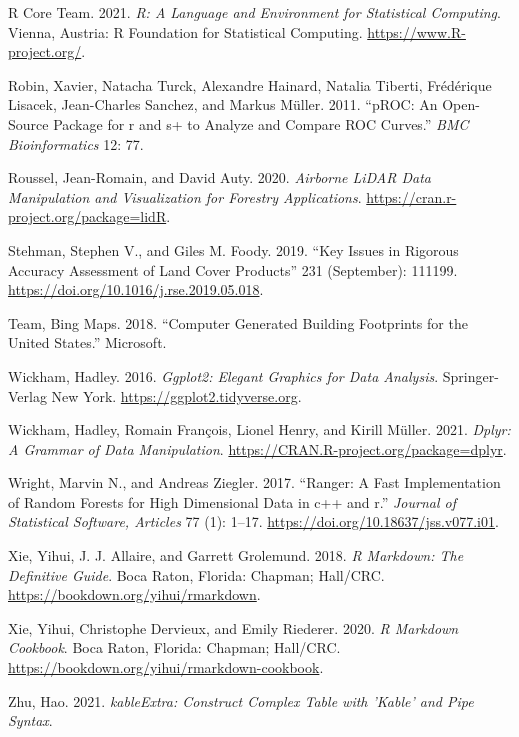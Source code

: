 \documentclass[]{elsarticle} %
\newlength{\cslhangindent}
\newenvironment{CSLReferences}[2] %
 {%
  \setlength{\parindent}{0pt}
  \ifodd #1 \everypar{\setlength{\hangindent}{\cslhangindent}}\ignorespaces\fi
  \ifnum #2 > 0
  \setlength{\parskip}{#2\baselineskip}
  \fi
 }%
 {}
\begin{document}
\begin{CSLReferences}{1}{0}
\leavevmode{}%
R Core Team. 2021. \emph{R: A Language and Environment for Statistical Computing}. Vienna, Austria: R Foundation for Statistical Computing. \url{https://www.R-project.org/}.

\leavevmode{}%
Robin, Xavier, Natacha Turck, Alexandre Hainard, Natalia Tiberti, Frédérique Lisacek, Jean-Charles Sanchez, and Markus Müller. 2011. {``pROC: An Open-Source Package for r and s+ to Analyze and Compare ROC Curves.''} \emph{BMC Bioinformatics} 12: 77.

\leavevmode{}%
Roussel, Jean-Romain, and David Auty. 2020. \emph{Airborne LiDAR Data Manipulation and Visualization for Forestry Applications}. \url{https://cran.r-project.org/package=lidR}.

\leavevmode{}%
Stehman, Stephen V., and Giles M. Foody. 2019. {``Key Issues in Rigorous Accuracy Assessment of Land Cover Products''} 231 (September): 111199. \url{https://doi.org/10.1016/j.rse.2019.05.018}.

\leavevmode{}%
Team, Bing Maps. 2018. {``{Computer Generated Building Footprints for the United States.}''} Microsoft.

\leavevmode{}%
Wickham, Hadley. 2016. \emph{Ggplot2: Elegant Graphics for Data Analysis}. Springer-Verlag New York. \url{https://ggplot2.tidyverse.org}.

\leavevmode{}%
Wickham, Hadley, Romain François, Lionel Henry, and Kirill Müller. 2021. \emph{Dplyr: A Grammar of Data Manipulation}. \url{https://CRAN.R-project.org/package=dplyr}.

\leavevmode{}%
Wright, Marvin N., and Andreas Ziegler. 2017. {``Ranger: A Fast Implementation of Random Forests for High Dimensional Data in c++ and r.''} \emph{Journal of Statistical Software, Articles} 77 (1): 1--17. \url{https://doi.org/10.18637/jss.v077.i01}.

\leavevmode{}%
Xie, Yihui, J. J. Allaire, and Garrett Grolemund. 2018. \emph{R Markdown: The Definitive Guide}. Boca Raton, Florida: Chapman; Hall/CRC. \url{https://bookdown.org/yihui/rmarkdown}.

\leavevmode{}%
Xie, Yihui, Christophe Dervieux, and Emily Riederer. 2020. \emph{R Markdown Cookbook}. Boca Raton, Florida: Chapman; Hall/CRC. \url{https://bookdown.org/yihui/rmarkdown-cookbook}.

\leavevmode{}%
Zhu, Hao. 2021. \emph{kableExtra: Construct Complex Table with 'Kable' and Pipe Syntax}.

\end{CSLReferences}
\end{document}
